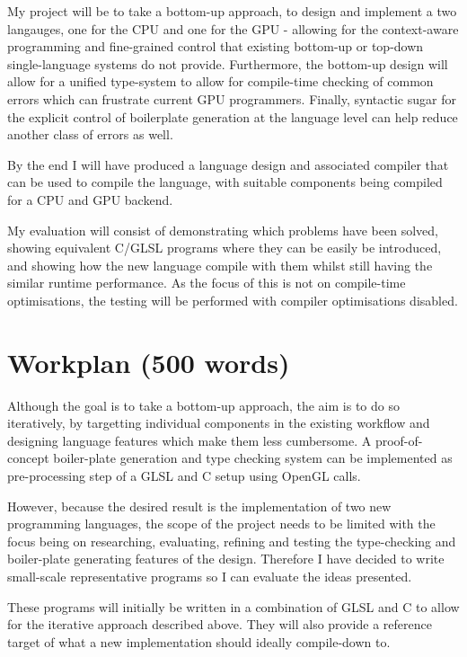 \documentclass[11pt]{article}
\begin{document}
My project will be to take a bottom-up approach, to design and implement a two
langauges, one for the CPU and one for the GPU - allowing for the context-aware
programming and fine-grained control that existing bottom-up or top-down
single-language systems do not provide. Furthermore, the bottom-up design will
allow for a unified type-system to allow for compile-time checking of common
errors which can frustrate current GPU programmers. Finally, syntactic sugar
for the explicit control of boilerplate generation at the language level can
help reduce another class of errors as well.

By the end I will have produced a language design and associated compiler that
can be used to compile the language, with suitable components being compiled
for a CPU and GPU backend.

My evaluation will consist of demonstrating which problems have been solved,
showing equivalent C/GLSL programs where they can be easily be introduced, and
showing how the new language compile with them whilst still having the similar
runtime performance. As the focus of this is not on compile-time optimisations,
the testing will be performed with compiler optimisations disabled.

\section{Workplan (500 words)}

Although the goal is to take a bottom-up approach, the aim is to do so
iteratively, by targetting individual components in the existing workflow and
designing language features which make them less cumbersome. A proof-of-concept
boiler-plate generation and type checking system can be implemented as
pre-processing step of a GLSL and C setup using OpenGL calls.

However, because the desired result is the implementation of two new
programming languages, the scope of the project needs to be limited with the
focus being on researching, evaluating, refining and testing the type-checking
and boiler-plate generating features of the design. Therefore I have decided to
write small-scale representative programs so I can evaluate the ideas
presented.

These programs will initially be written in a combination of GLSL and C to
allow for the iterative approach described above. They will also provide a
reference target of what a new implementation should ideally compile-down to.
\end{document}
